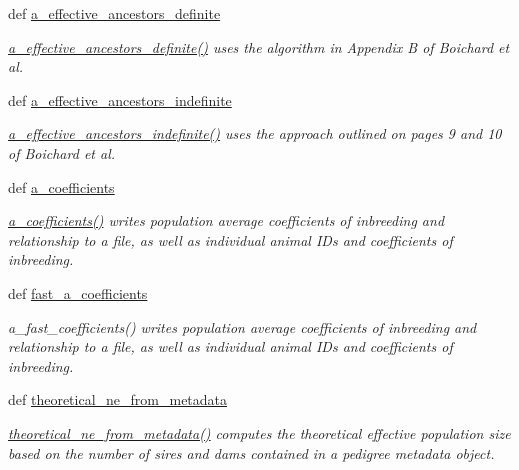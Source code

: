\begin{CompactItemize}
def \hyperlink{namespacePyPedal_1_1pyp__metrics_8821be8acfb9095c5f3776906568110b}{a\_\-effective\_\-ancestors\_\-definite}
\begin{CompactList}\small\item\em \hyperlink{namespacePyPedal_1_1pyp__metrics_8821be8acfb9095c5f3776906568110b}{a\_\-effective\_\-ancestors\_\-definite()} uses the algorithm in Appendix B of Boichard et al. \item\end{CompactList}\item 
def \hyperlink{namespacePyPedal_1_1pyp__metrics_dcfac272aea7f8f5d0e43ef9d400f6fa}{a\_\-effective\_\-ancestors\_\-indefinite}
\begin{CompactList}\small\item\em \hyperlink{namespacePyPedal_1_1pyp__metrics_dcfac272aea7f8f5d0e43ef9d400f6fa}{a\_\-effective\_\-ancestors\_\-indefinite()} uses the approach outlined on pages 9 and 10 of Boichard et al. \item\end{CompactList}\item 
def \hyperlink{namespacePyPedal_1_1pyp__metrics_e298ad3dcbaf85dc2cbf946d188a5265}{a\_\-coefficients}
\begin{CompactList}\small\item\em \hyperlink{namespacePyPedal_1_1pyp__metrics_e298ad3dcbaf85dc2cbf946d188a5265}{a\_\-coefficients()} writes population average coefficients of inbreeding and relationship to a file, as well as individual animal IDs and coefficients of inbreeding. \item\end{CompactList}\item 
def \hyperlink{namespacePyPedal_1_1pyp__metrics_b054b0e4d468ae4013645af61102f6f3}{fast\_\-a\_\-coefficients}
\begin{CompactList}\small\item\em a\_\-fast\_\-coefficients() writes population average coefficients of inbreeding and relationship to a file, as well as individual animal IDs and coefficients of inbreeding. \item\end{CompactList}\item 
def \hyperlink{namespacePyPedal_1_1pyp__metrics_11dc9cb957ff03c709cecd2cbb996e33}{theoretical\_\-ne\_\-from\_\-metadata}
\begin{CompactList}\small\item\em \hyperlink{namespacePyPedal_1_1pyp__metrics_11dc9cb957ff03c709cecd2cbb996e33}{theoretical\_\-ne\_\-from\_\-metadata()} computes the theoretical effective population size based on the number of sires and dams contained in a pedigree metadata object. \item\end{CompactList}\item 

\end{CompactItemize}
